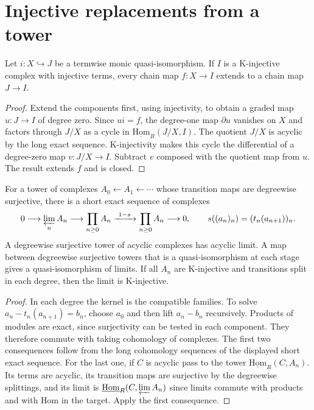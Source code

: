 \section{Injective replacements from a tower}

\begin{lemma}\label{res:U04}
Let \(i:X\hookrightarrow J\) be a termwise monic quasi-isomorphism.
If \(I\) is a K-injective complex with injective terms, every
chain map \(f:X\to I\) extends to a chain map \(J\to I\).
\end{lemma}
\begin{proof}
Extend the components first, using injectivity, to obtain a graded
map \(u:J\to I\) of degree zero. Since \(u i=f\), the degree-one
map \(\partial u\) vanishes on \(X\) and factors through \(J/X\)
as a cycle in \(\underline{\mathrm{Hom}}_R(J/X,I)\).
The quotient \(J/X\) is acyclic by the long exact sequence.
K-injectivity makes this cycle the differential of a degree-zero
map \(v:J/X\to I\). Subtract \(v\) composed with the quotient
map from \(u\). The result extends \(f\) and is closed.
\end{proof}

\begin{lemma}\label{res:U05}
For a tower of complexes \(A_0\leftarrow A_1\leftarrow\cdots\)
whose transition maps are degreewise surjective, there is a short
exact sequence of complexes
\[
 0\longrightarrow\varprojlim_n A_n\longrightarrow
 \prod_{n\geq0} A_n
 \xrightarrow{\ 1-s\ }\prod_{n\geq0} A_n
 \longrightarrow0,
\qquad
 s((a_n)_n)=(t_n(a_{n+1}))_n .
\]
A degreewise surjective tower of acyclic complexes has acyclic
limit. A map between degreewise surjective towers that is a
quasi-isomorphism at each stage gives a quasi-isomorphism of
limits. If all \(A_n\) are K-injective and transitions split
in each degree, then the limit is K-injective.
\end{lemma}
\begin{proof}
In each degree the kernel is the compatible families.
To solve \(a_n-t_n(a_{n+1})=b_n\), choose \(a_0\) and then
lift \(a_n-b_n\) recursively. Products of modules are exact,
since surjectivity can be tested in each component. They
therefore commute with taking cohomology of complexes.
The first two consequences follow from the long cohomology
sequences of the displayed short exact sequence.
For the last one, if \(C\) is acyclic pass to the tower
\(\underline{\mathrm{Hom}}_R(C,A_n)\). Its terms are acyclic,
its transition maps are surjective by the degreewise splittings,
and its limit is \(\underline{\mathrm{Hom}}_R(C,\varprojlim A_n)\)
since limits commute with products and with Hom in the target.
Apply the first consequence.
\end{proof}

